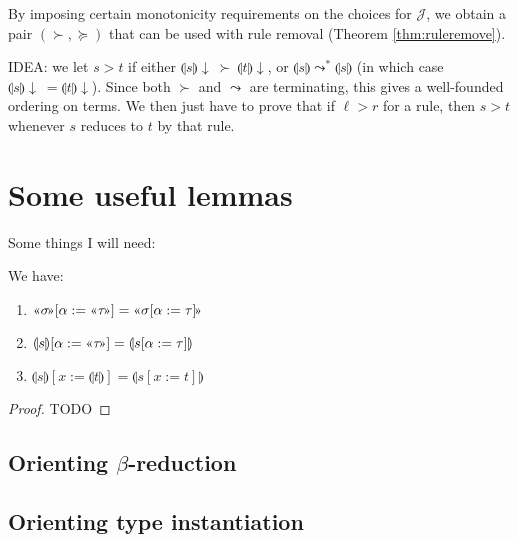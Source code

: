 \documentclass[runningheads,a4paper]{llncs}
\newcommand{\Rules}{\mathcal{R}}
\newcommand{\Termmap}{\mathcal{J}}
\newcommand{\typeinterpret}[1]{\text{\guillemotleft} #1\! \text{\guillemotright}}
\newcommand{\interpret}[1]{\llparenthesis #1 \rrparenthesis}
\newcommand{\arr}[1]{\to_{#1}}
\begin{document}
By imposing certain monotonicity requirements on the choices for
$\Termmap$, we obtain a pair $(\succ,\succeq)$ that can be used with
rule removal (Theorem \ref{thm:ruleremove}).

IDEA: we let $s > t$ if either $\interpret{s}\downarrow\:\succ\:
\interpret{t}\downarrow$, or $\interpret{s} \leadsto^* \interpret{s}$
(in which case $\interpret{s}\downarrow\:=\interpret{t}\downarrow$).
Since both $\succ$ and $\leadsto$ are terminating, this gives a
well-founded ordering on terms.  We then just have to prove that if
$\ell > r$ for a rule, then $s > t$ whenever $s$ reduces to $t$ by
that rule.

%

\section{Some useful lemmas}

Some things I will need:

\begin{lemma}\label{lem:substitutioninterpret}
We have:
\begin{enumerate}
\item\label{lem:substitutioninterpret:types}
  $\typeinterpret{\sigma}[\alpha:=\typeinterpret{\tau}] =
  \typeinterpret{\sigma[\alpha:=\tau]}$
\item\label{lem:substitutioninterpret:mixed}
  $\interpret{s}[\alpha:=\typeinterpret{\tau}] =
  \interpret{s[\alpha:=\tau]}$
\item\label{lem:substitutioninterpret:terms}
  $\interpret{s}[x:=\interpret{t}] = \interpret{s[x:=t]}$
\end{enumerate}
\end{lemma}

\begin{proof}
TODO
\end{proof}

\subsection{Orienting $\beta$-reduction}

\subsection{Orienting type instantiation}
\end{document}
